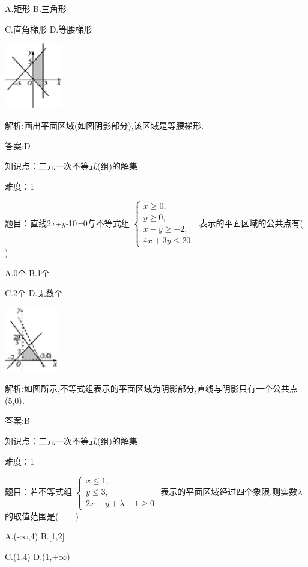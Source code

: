 \documentclass{article} %
\begin{document}
 A.矩形 B.三角形

 C.直角梯形 D.等腰梯形

 \includegraphics*[width=1.00in, height=1.13in, keepaspectratio=false]{image1508}

 解析:画出平面区域(如图阴影部分),该区域是等腰梯形\textit{.}

 答案:D

知识点：二元一次不等式(组)的解集

难度：1

 题目：直线2\textit{x+y-}10\textit{=}0与不等式组
$
\begin{cases}
x \ge 0,\\
y \ge 0,\\
x-y \ge -2,\\
4x+3y \le 20.
\end{cases}$
表示的平面区域的公共点有(\textit{　　})

 A.0个 B.1个

 C.2个 D.无数个

 \includegraphics*[width=0.93in, height=1.11in, keepaspectratio=false]{image1510}

 解析:如图所示,不等式组表示的平面区域为阴影部分,直线与阴影只有一个公共点(5,0)\textit{.}

 答案:B

知识点：二元一次不等式(组)的解集

难度：1

 题目：若不等式组
$
\begin{cases}
x \le 1,\\
y \le 3,\\
2x-y + \lambda -1 \ge 0
\end{cases}$
表示的平面区域经过四个象限,则实数\textit{$\lambda$}的取值范围是(\textit{　　})

 A.(\textit{-$\infty$},4) B.[1,2]

 C.(1,4) D.(1,\textit{$+\infty$})
\end{document}
